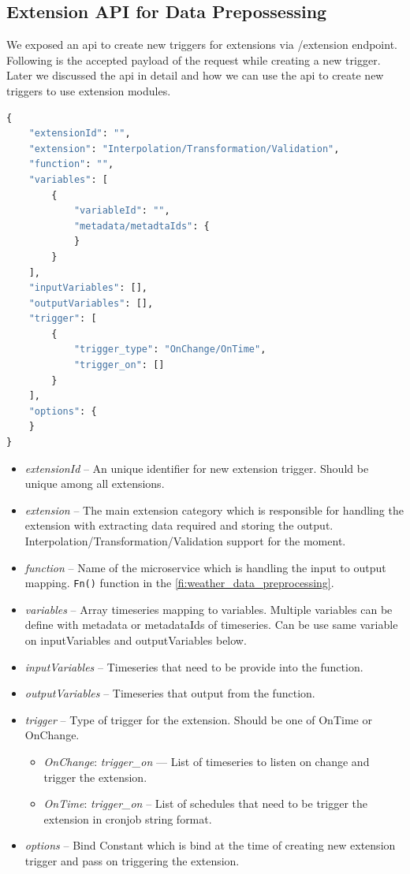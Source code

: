 \subsection{Extension API for Data Prepossessing}

We exposed an \acrshort{api} to create new triggers for extensions via /extension endpoint. Following is the accepted payload of the request while creating a new trigger. Later we discussed the \acrshort{api} in detail and how we can use the \acrshort{api} to create new triggers to use extension modules.

\begin{lstlisting}[language=Python]
{
    "extensionId": "",
    "extension": "Interpolation/Transformation/Validation",
    "function": "",
    "variables": [
        {
            "variableId": "",
            "metadata/metadtaIds": {
            }
        }
    ],
    "inputVariables": [],
    "outputVariables": [],
    "trigger": [
        {
            "trigger_type": "OnChange/OnTime",
            "trigger_on": []
        }
    ],
    "options": {
    }
}
\end{lstlisting}
\begin{itemize}
    \item \emph{extensionId} -- An unique identifier for new extension trigger. Should be unique among all extensions.
    \item \emph{extension} -- The main extension category which is responsible for handling the extension with extracting data required and storing the output. Interpolation/Transformation/Validation support for the moment.
    \item \emph{function} -- Name of the microservice which is handling the input to output mapping. \texttt{Fn()} function in the \cref{fi:weather_data_preprocessing}.
    \item \emph{variables} -- Array timeseries mapping to variables. Multiple variables can be define with metadata or metadataIds of timeseries. Can be use same variable on inputVariables and outputVariables below.
    \item \emph{inputVariables} -- Timeseries that need to be provide into the function.
    \item \emph{outputVariables} -- Timeseries that output from the function.
    \item \emph{trigger} -- Type of trigger for the extension. Should be one of OnTime or OnChange.
        \begin{itemize}
            \item \emph{OnChange}: \textit{trigger\_on} --- List of timeseries to listen on change and trigger the extension.
            \item \emph{OnTime}: \textit{trigger\_on} -- List of schedules that need to be trigger the extension in cronjob string format.
        \end{itemize}
    \item \emph{options} -- Bind Constant which is bind at the time of creating new extension trigger and pass on triggering the extension.
\end{itemize}

